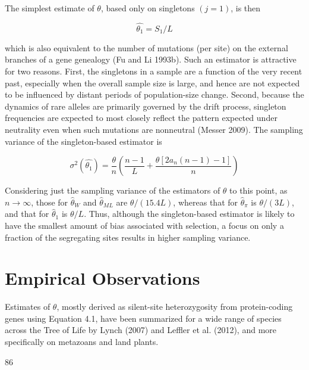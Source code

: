 \documentclass{article}
\begin{document}
The simplest estimate of  $ \theta $, based only on singletons  $ (j = 1) $, is then

\begin{equation}
\widehat{\theta_{1}}=S_{1}/L
\tag{4.6a}
\label{eq:4_6a}
\end{equation}

which is also equivalent to the number of mutations (per site) on the external branches of a gene genealogy (Fu and Li 1993b). Such an estimator is attractive for two reasons. First, the singletons in a sample are a function of the very recent past, especially when the overall sample size is large, and hence are not expected to be influenced by distant periods of population-size change. Second, because the dynamics of rare alleles are primarily governed by the drift process, singleton frequencies are expected to most closely reflect the pattern expected under neutrality even when such mutations are nonneutral (Messer 2009). The sampling variance of the singleton-based estimator is

\begin{equation}
\sigma^{2}(\widehat{\theta_{1}})=\frac{\theta}{n}\left(\frac{n-1}{L}+\frac{\theta[2a_{n}(n-1)-1]}{n}\right)
\tag{4.6b}
\label{eq:4_6b}
\end{equation}

Considering just the sampling variance of the estimators of  $ \theta $ to this point, as  $ n \to \infty $, those for  $ \widehat{\theta}_W $ and  $ \widehat{\theta}_{ML} $ are  $ \theta/(15.4L) $, whereas that for  $ \widehat{\theta}_\pi $ is  $ \theta/(3L) $, and that for  $ \widehat{\theta}_1 $ is  $ \theta/L $. Thus, although the singleton-based estimator is likely to have the smallest amount of bias associated with selection, a focus on only a fraction of the segregating sites results in higher sampling variance.

\section{Empirical Observations}
Estimates of  $ \theta $, mostly derived as silent-site heterozygosity from protein-coding genes using Equation 4.1, have been summarized for a wide range of species across the Tree of Life by Lynch (2007) and Leffler et al. (2012), and more specifically on metazoans and land plants.

86
\end{document}
